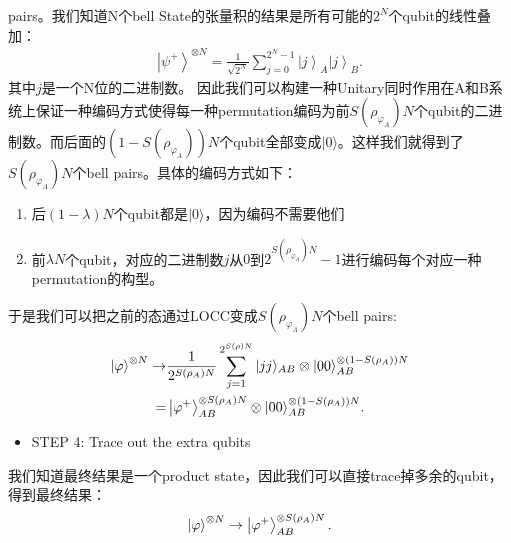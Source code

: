 pairs。我们知道N个bell State的张量积的结果是所有可能的$ 2^N $个qubit的线性叠加：
\begin{align}
  \left|\psi^{+}\right\rangle^{\otimes
  N}=\frac{1}{\sqrt{2^N}}\sum_{j=0}^{2^N-1}\left|j\right\rangle_A\left|j\right\rangle_B.
\end{align}
其中$ j $是一个N位的二进制数。
因此我们可以构建一种Unitary同时作用在A和B系统上保证一种编码方式使得每一种permutation编码为前$
S(\rho_{\varphi_A})N $个qubit的二进制数。而后面的$ (1-S(\rho_{\varphi_A}))N
$个qubit全部变成$ |0\rangle $。这样我们就得到了$ S(\rho_{\varphi_A})N $个bell pairs。具体的编码方式如下：
\begin{enumerate}
  \item 后$ (1-\lambda) N $个qubit都是$ |0\rangle $，因为编码不需要他们
  \item 前$ \lambda N $个qubit，对应的二进制数$ j $从$ 0 $到$
    2^{S(\rho_{\varphi_A})N}-1 $进行编码每个对应一种permutation的构型。
\end{enumerate}
于是我们可以把之前的态通过LOCC变成$ S(\rho_{\varphi_A})N $个bell pairs:
\begin{align}
  \left| \varphi \right\rangle^{\otimes N} \to
  &\frac{1}{2^{S(\rho_A)N}}\sum_{j=1}^{2^{S(\rho)N}}|jj\rangle_{AB}\otimes|00\rangle_{AB}^{\otimes(1-S(\rho_A))N}\\
  = &\left|\varphi^+\right\rangle_{AB}^{\otimes
  S(\rho_A)N}\otimes|00\rangle_{AB}^{\otimes(1-S(\rho_A))N}.
\end{align}
\begin{itemize}
  \item STEP 4: Trace out the extra qubits
\end{itemize}
我们知道最终结果是一个product state，因此我们可以直接trace掉多余的qubit，得到最终结果：
\begin{align}
  \left| \varphi \right\rangle^{\otimes N} \to
  \left|\varphi^+\right\rangle_{AB}^{\otimes S(\rho_A)N}.
\end{align}
